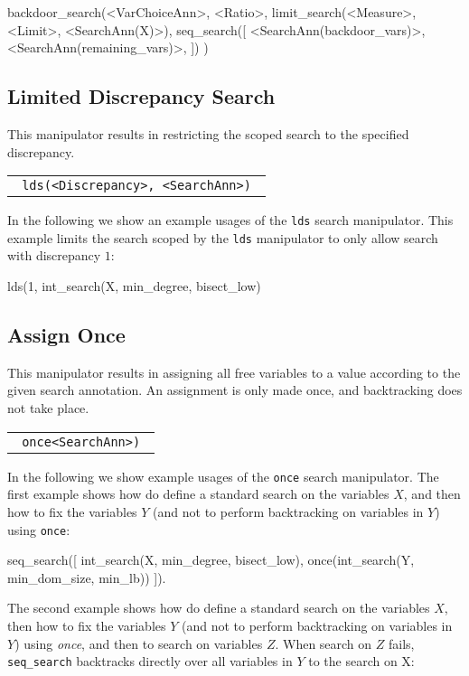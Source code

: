 \documentclass[a4paper]{article}
\newcommand{\fz}[1]{\texttt{#1}}
\newcommand{\vblabel}[1]	{\large\textbf{#1}}
\begin{document}
\begin{Zinc}[label={\vblabel{Backdoor Search}}]
backdoor_search(<VarChoiceAnn>, <Ratio>,
    limit_search(<Measure>, <Limit>, <SearchAnn(X)>),
        seq_search([
            <SearchAnn(backdoor_vars)>,
            <SearchAnn(remaining_vars)>,
        ])
)
\end{Zinc}

\subsection{Limited Discrepancy Search}
This manipulator results in restricting the scoped search to the specified 
discrepancy.

\begin{tabular}{l}
\fz{
lds(<Discrepancy>, <SearchAnn>)
}
\end{tabular}

In the following we show an example usages of the \fz{lds} search manipulator.
This example limits the search scoped by the \fz{lds} manipulator to only 
allow search with discrepancy $1$:
\begin{Zinc}[label={\vblabel{Example: Limited Discrepancy Search}}]
lds(1, int_search(X, min_degree,  bisect_low)  
\end{Zinc}

\subsection{Assign Once}
This manipulator results in assigning all free variables to a value according
to the given search annotation. An assignment is only made once, and backtracking
does not take place.

\begin{tabular}{l}
\fz{
once<SearchAnn>)
}
\end{tabular}

In the following we show example usages of the \fz{once} search manipulator.
The first example shows how do define a standard search on the variables $X$, and then how to fix the variables $Y$ (and not to perform backtracking on variables in $Y$) using \fz{once}:

\begin{Zinc}[label={\vblabel{Example 1: Search Once}}]
seq_search([
    int_search(X, min_degree,  bisect_low),  
    once(int_search(Y, min_dom_size, min_lb)) 
]).
\end{Zinc}
The second  example shows how do define a standard search on the variables $X$, then how to fix the variables $Y$ (and not to perform backtracking on variables in $Y$) using \emph{once}, and then to search on variables $Z$. When search on $Z$ fails, \fz{seq\_search} backtracks directly over all variables in $Y$ to the search on X:
\end{document}
